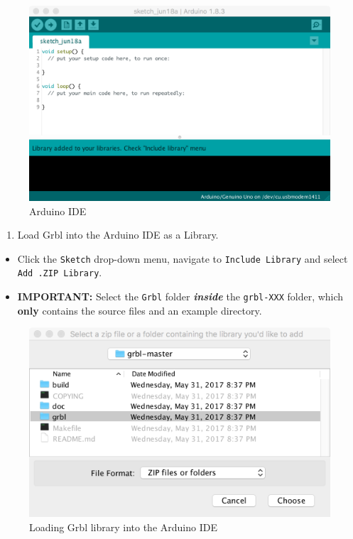 \documentclass[]{book}
\providecommand{\tightlist}{%
  \setlength{\itemsep}{0pt}\setlength{\parskip}{0pt}}
\theoremstyle{definition}
\theoremstyle{definition}
\theoremstyle{remark}
\begin{document}
\begin{figure}

{\centering \includegraphics[width=0.75\linewidth]{images/arduino_IDE} 

}

\caption{Arduino IDE}\label{fig:arduinoIDE}
\end{figure}

\begin{enumerate}
\def\labelenumi{\arabic{enumi}.}
\setcounter{enumi}{2}
\tightlist
\item
  Load Grbl into the Arduino IDE as a Library.
\end{enumerate}

\begin{itemize}
\tightlist
\item
  Click the \texttt{Sketch} drop-down menu, navigate to
  \texttt{Include\ Library} and select \texttt{Add\ .ZIP\ Library}.
\item
  \textbf{IMPORTANT:} Select the \texttt{Grbl} folder
  \textbf{\emph{inside}} the \texttt{grbl-XXX} folder, which
  \textbf{only} contains the source files and an example directory.
\end{itemize}

\begin{figure}

{\centering \includegraphics[width=0.75\linewidth]{images/add_grbl_lib} 

}

\caption{Loading Grbl library into the Arduino IDE}\label{fig:addGrblLib}
\end{figure}
\end{document}
